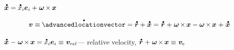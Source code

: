 \begin{otherlanguage}{russian}
${
\mathdotabove{\bm{x}} = \mathdotabove{x}_i \bm{e}_i + \hspace{.1ex} \bm{\omega} \hspace{-0.16ex} \times \hspace{-0.16ex} \bm{x}
}$

\begin{equation*}
\bm{v} \equiv \hspace{-0.1ex} \mathdotabove{\advancedlocationvector} = \mathdotabove{\locationvector} + \mathdotabove{\bm{x}}
= \hspace{-0.2ex} \tikzmark{beginEVelocity} \hspace{.25ex} \mathdotabove{\locationvector} \hspace{.1ex} + \hspace{.1ex} \bm{\omega} \hspace{-0.2ex} \times \hspace{-0.2ex} \bm{x} \tikzmark{endEVelocity}
\hspace{.4ex} \tikzmark{beginRelativeVelocity} \hspace{-0.4ex} - \bm{\omega} \hspace{-0.2ex} \times \hspace{-0.2ex} \bm{x} \hspace{.1ex} + \hspace{.1ex} \mathdotabove{\bm{x}} \hspace{-0.33ex} \tikzmark{endRelativeVelocity}
\end{equation*}%

${
\mathdotabove{\bm{x}} \hspace{.1ex} - \hspace{.1ex} \bm{\omega} \hspace{-0.2ex} \times \hspace{-0.2ex} \bm{x} = \mathdotabove{x}_i \bm{e}_i
\equiv \hspace{.1ex} \bm{v}_{r\kern-0.1exel}
}$\:--- relative velocity,
${
\mathdotabove{\locationvector} \hspace{.1ex} + \hspace{.1ex} \bm{\omega} \hspace{-0.2ex} \times \hspace{-0.2ex} \bm{x}
\equiv \hspace{.1ex} \bm{v}_{\hspace{-0.1ex}e}
}$


\end{otherlanguage}
